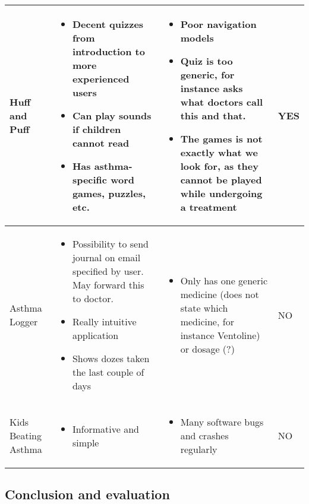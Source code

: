 \begin{center}
\begin{tabular}{ | p{2.5cm} | p{5cm} | p{5cm} | p{2cm}|}
	Huff and Puff & 
	\begin{itemize}
	  \item Decent quizzes from introduction to more experienced users
	  \item Can play sounds if children cannot read
	  \item Has asthma-specific word games, puzzles, etc.  
	\end{itemize}
	&
	\begin{itemize}
	  \item Poor navigation models
	  \item Quiz is too generic, for instance asks what doctors call this and that.
	  \item The games is not exactly what we look for, as they cannot be played while undergoing a treatment  
	\end{itemize}
	&
	YES
	\\ \hline
	Asthma Logger & 
	\begin{itemize}
	  \item Possibility to send journal on email specified by user. May forward this to doctor.  
	  \item Really intuitive application
	  \item Shows dozes taken the last couple of days
	\end{itemize}
	& 
	\begin{itemize}
	  \item Only has one generic medicine (does not state which medicine, for instance Ventoline) or dosage (?) 
	\end{itemize}
	& 
	NO
	\\ \hline
	Kids Beating Asthma
	& 
	\begin{itemize}
	  \item Informative and simple
	\end{itemize}
	&
	\begin{itemize}
	  \item Many software bugs and crashes regularly
	\end{itemize}
	& NO
	\\ \hline
	\end{tabular}
\end{center}

\subsection{Conclusion and evaluation}
\label{existingconcl}

